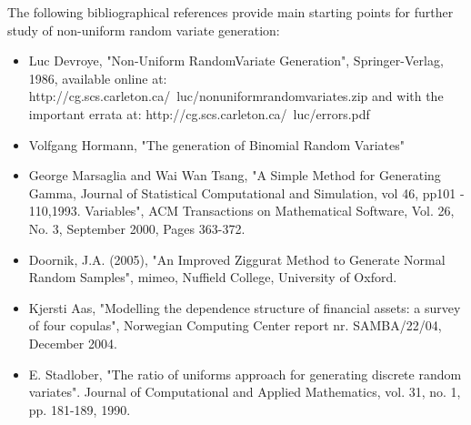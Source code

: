             {
              The following bibliographical references provide main starting points for further study of non-uniform random variate generation:
              \begin{itemize}
              \item Luc Devroye, "Non-Uniform RandomVariate Generation", Springer-Verlag, 1986, available online at:
                http://cg.scs.carleton.ca/~luc/nonuniformrandomvariates.zip
                and with the important errata at:
                http://cg.scs.carleton.ca/~luc/errors.pdf
              \item Volfgang Hormann, "The generation of Binomial Random Variates"
              \item George Marsaglia and Wai Wan Tsang, "A Simple Method for Generating Gamma, Journal of Statistical Computational and Simulation, vol 46, pp101 - 110,1993.
                Variables", ACM Transactions on Mathematical Software, Vol. 26, No. 3,
                September 2000, Pages 363-372.
              \item Doornik, J.A. (2005), "An Improved Ziggurat Method to Generate Normal
                Random Samples", mimeo, Nuffield College, University of Oxford.
              \item Kjersti Aas, "Modelling the dependence structure of financial assets: a survey of four copulas",
                Norwegian Computing Center report nr. SAMBA/22/04, December 2004.
              \item E. Stadlober, "The ratio of uniforms approach for generating discrete random variates". Journal of Computational and Applied Mathematics, vol. 31, no. 1, pp. 181-189, 1990.
              \end{itemize}
            }
            \Example{

              --

            }
